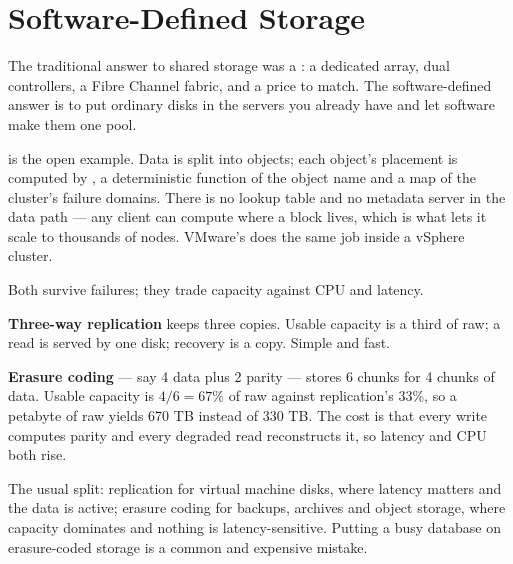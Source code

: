 \section{Software-Defined Storage}

The traditional answer to shared storage was a : a dedicated array,
dual controllers, a Fibre Channel fabric, and a price to match. The
software-defined answer is to put ordinary disks in the servers you already
have and let software make them one pool.

 is the open example. Data is split into objects; each object's
placement is computed by , a deterministic function of the object
name and a map of the cluster's failure domains. There is no lookup table and
no metadata server in the data path --- any client can compute where a block
lives, which is what lets it scale to thousands of nodes. VMware's 
does the same job inside a vSphere cluster.

\begin{conceptbox}
Both survive failures; they trade capacity against CPU and latency.

\smallskip
\textbf{Three-way replication} keeps three copies. Usable capacity is a third
of raw; a read is served by one disk; recovery is a copy. Simple and fast.

\smallskip
\textbf{Erasure coding} --- say 4 data plus 2 parity --- stores 6 chunks for 4
chunks of data. Usable capacity is $4/6 = 67\%$ of raw against replication's
33\%, so a petabyte of raw yields 670 TB instead of 330 TB. The cost is that
every write computes parity and every degraded read reconstructs it, so
latency and CPU both rise.

\smallskip
The usual split: replication for virtual machine disks, where latency matters
and the data is active; erasure coding for backups, archives and object
storage, where capacity dominates and nothing is latency-sensitive. Putting a
busy database on erasure-coded storage is a common and expensive mistake.
\end{conceptbox}


